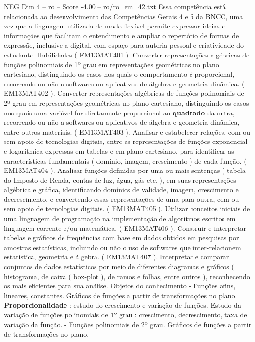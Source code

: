 \begin{textsample}{NEG Dim 4 – ro – Score -4.00 – ro/ro\_em\_42.txt}
Essa competência está relacionada ao desenvolvimento das Competências Gerais 4 e 5 da BNCC, uma vez que a linguagem utilizada de modo flexível permite expressar ideias e informações que facilitam o entendimento e ampliar o repertório de formas de expressão, inclusive a digital, com espaço para autoria pessoal e criatividade do estudante.
Habilidades ( EM13MAT401 ).
Converter representações algébricas de funções polinomiais de 1º grau em representações geométricas no plano cartesiano, distinguindo os casos nos quais o comportamento é proporcional, recorrendo ou não a softwares ou aplicativos de álgebra e geometria dinâmica. ( EM13MAT402 ).
Converter representações algébricas de funções polinomiais de 2º grau em representações geométricas no plano cartesiano, distinguindo os casos nos quais uma variável for diretamente proporcional ao \textbf{quadrado} da outra, recorrendo ou não a softwares ou aplicativos de álgebra e geometria dinâmica, entre outros materiais. ( EM13MAT403 ).
Analisar e estabelecer relações, com ou sem apoio de tecnologias digitais, entre as representações de funções exponencial e logarítmica expressas em tabelas e em plano cartesiano, para identificar as características fundamentais ( domínio, imagem, crescimento ) de cada função. ( EM13MAT404 ).
Analisar funções definidas por uma ou mais sentenças ( tabela do Imposto de Renda, contas de luz, água, gás etc. ), em suas representações algébrica e gráfica, identificando domínios de validade, imagem, crescimento e decrescimento, e convertendo essas representações de uma para outra, com ou sem apoio de tecnologias digitais. ( EM13MAT405 ).
Utilizar conceitos iniciais de uma linguagem de programação na implementação de algoritmos escritos em linguagem corrente e/ou matemática. ( EM13MAT406 ).
Construir e interpretar tabelas e gráficos de frequências com base em dados obtidos em pesquisas por amostras estatísticas, incluindo ou não o uso de softwares que inter-relacionem estatística, geometria e álgebra. ( EM13MAT407 ).
Interpretar e comparar conjuntos de dados estatísticos por meio de diferentes diagramas e gráficos ( histograma, de caixa ( box-plot ), de ramos e folhas, entre outros ), reconhecendo os mais eficientes para sua análise.
Objetos do conhecimento - Funções afins, lineares, constantes.
Gráficos de funções a partir de transformações no plano. \textbf{Proporcionalidade} : estudo do crescimento e variação de funções.
Estudo da variação de funções polinomiais de 1º grau : crescimento, decrescimento, taxa de variação da função. - Funções polinomiais de 2º grau.
Gráficos de funções a partir de transformações no plano.

\end{textsample}
